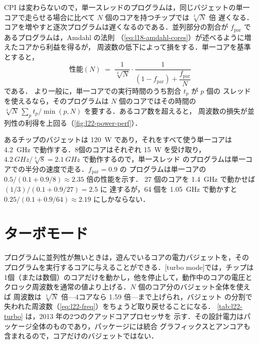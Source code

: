 \documentclass[../main.tex]{subfiles}
\begin{document}
\begin{marginfigure}
  \resizebox{\linewidth}{!}{}
  \caption{1コア分の電力バジェットを $N$ 個のコアが分け合うときの性能．
    \cref{eq:l22-perf} による．}
  \label{fig:l22-power-perf}
\end{marginfigure}
CPI は変わらないので，単一スレッドのプログラムは，同じバジェットの単一
コアで走らせる場合に比べて $N$ 個のコアを持つチップでは $\sqrt[3]{N}$ 倍
遅くなる．コアを増やすと逐次プログラムは遅くなるのである．並列部分の割合が
$f_{\mathrm{par}}$ であるプログラムは，Amdahl の法則
（\cref{eq:l18-amdahl-cores}）が述べるように増えたコアから利益を得るが，
周波数の低下によって損をする．単一コアを基準とすると，
\begin{equation}
  \text{性能}(N) \;=\; \frac{1}{\sqrt[3]{N}}\cdot
  \frac{1}{(1-f_{\mathrm{par}}) + \dfrac{f_{\mathrm{par}}}{N}}
  \label{eq:l22-perf}
\end{equation}
である．%
より一般に，単一コアでの実行時間のうち割合 $t_{p}$ が $p$ 個の
スレッドを使えるなら，そのプログラムは $N$ 個のコアではその時間の
$\sqrt[3]{N}\,\sum_{p} t_{p}/\min(p,N)$ を要する．あるコア数を超えると，
周波数の損失が並列性の利得を上回る（\cref{fig:l22-power-perf}）．

\begin{example}
  \label{ex:l22-power}
  あるチップのバジェットは \SI{120}{W} であり，それをすべて使う単一コアは
  \SI{4.2}{GHz} で動作する．8個のコアはそれぞれ \SI{15}{W} を受け取り，
  $\SI{4.2}{GHz}/\sqrt[3]{8}=\SI{2.1}{GHz}$ で動作するので，単一スレッド
  のプログラムは単一コアでの半分の速度で走る．$f_{\mathrm{par}}=0.9$ の
  プログラムは単一コアの $0.5/(0.1+0.9/8)\approx 2.35$ 倍の性能を示す．
  27 個のコアを \SI{1.4}{GHz} で動かせば $(1/3)/(0.1+0.9/27)=2.5$ に
  達するが，64 個を \SI{1.05}{GHz} で動かすと
  $0.25/(0.1+0.9/64)\approx 2.19$ にしかならない．
\end{example}

\section{ターボモード}
\label{sec:l22-turbo}

プログラムに並列性が無いときは，遊んでいるコアの電力バジェットを，その
プログラムを実行するコアに与えることができる．[turbo mode]では，チップは
1個（または数個）のコアだけを動かし，他を停止して，動作中のコアの電圧と
クロック周波数を通常の値より上げる．$N$ 個のコア分のバジェット全体を使えば
周波数は $\sqrt[3]{N}$ 倍---4コアなら 1.59 倍---まで上げられ，バジェット
の分割で失われた周波数（\cref{eq:l22-freq}）をちょうど取り戻せることになる．
\cref{tab:l22-turbo} は，2013 年の2つのクアッドコアプロセッサを
示す．その設計電力はパッケージ全体のものであり，パッケージには統合
グラフィックスとアンコアも含まれるので，コアだけのバジェットではない．
\end{document}
